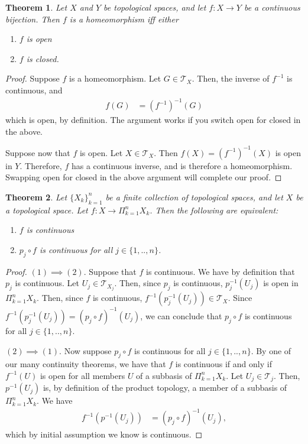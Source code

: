\documentclass[10pt,a4paper]{article}
\author{Jeremiah Givens}
\theoremstyle{theorem}
\newtheorem{theorem}{Theorem}
\theoremstyle{definition}
\newcommand{\Tau}{\mathcal{T}}
\begin{document}
\begin{theorem}
Let $X$ and $Y$ be topological spaces, and let $f:X \to Y$ be a continuous bijection.  Then $f$ is a homeomorphism iff either 
\begin{enumerate}
\item $f$ is open
\item $f$ is closed.
\end{enumerate}
\end{theorem}
\begin{proof}
Suppose $f$ is a homeomorphism. Let $G \in \Tau_X$. Then,  the inverse of $f^{-1}$ is continuous, and 
\begin{align*}
f(G) &= (f^{-1})^{-1}(G)
\end{align*}
which is open, by definition. The argument works if you switch open for closed in the above.

Suppose now that $f$ is open. Let $X \in \Tau_X$.  Then $f(X) = (f^{-1})^{-1}(X)$ is open in $Y$.  Therefore, $f$ has a continuous inverse, and is therefore a homeomorphism. Swapping open for closed in the above argument will complete our proof.
\end{proof}

\begin{theorem}
Let $\{X_k\}_{k = 1}^n$ be a finite collection of topological spaces, and let $X$ be a topological space. Let $f:X \to \Pi_{k=1}^n X_k$. Then the following are equivalent:
\begin{enumerate}
\item $f$ is continuous
\item $p_j \circ f$ is continuous for all $j \in \{1, ..,n\}$.
\end{enumerate}
\end{theorem}

\begin{proof}
$(1) \implies (2)$. Suppose that $f$ is continuous. We have by definition that $p_j$ is continuous. Let $U_j \in \Tau_{X_j}$. Then, since $p_j$ is continuous, $p_{j}^{-1}(U_j)$ is open in $\Pi_{k=1}^n X_k$. Then, since $f$ is continuous, $f^{-1}(p_{j}^{-1}(U_j)) \in \Tau_X$.  Since $f^{-1}(p_{j}^{-1}(U_j)) = (p_j \circ f)^{-1}(U_j)$, we can conclude that $p_j \circ f$ is continuous for all $j \in \{1, ..,n\}$.

$(2) \implies (1)$. Now suppose $p_j \circ f$ is continuous for all $j \in \{1, ..,n\}$. By one of our many continuity theorems, we have that $f$ is continuous if and only if $f^{-1}(U)$ is open for all members $U$ of a subbasis of  $\Pi_{k=1}^n X_k$. Let $U_j \in \Tau_j$. Then, $p^{-1}(U_j)$ is, by definition of the product topology, a member of a subbasis of $\Pi_{k=1}^n X_k$. We have
\begin{align*}
f^{-1}(p^{-1}(U_j)) &= (p_j \circ f)^{-1}(U_j),
\end{align*}
which by initial assumption we know is continuous.
\end{proof}
\end{document}
